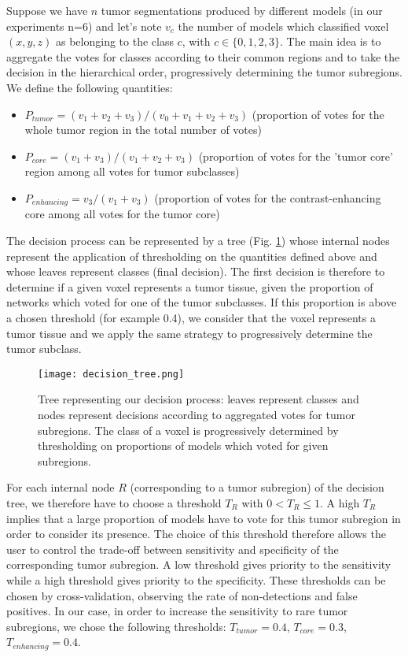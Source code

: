 \documentclass[preprint,12pt]{elsarticle}
\begin{document}
Suppose we have $n$ tumor segmentations produced by different models (in our experiments n=6) and let's note $v_c$ the number of models which classified voxel $(x,y,z)$ as belonging to the class $c$, with $c \in \{0, 1, 2, 3\}$. The main idea is to aggregate the votes for classes according to their common regions and to take the decision in the hierarchical order, progressively determining the tumor subregions. We define the following quantities:
\begin{itemize}
\item $P_{tumor}=(v_1+v_2+v_3) / (v_0+ v_1+v_2+v_3)$ (proportion of votes for the whole tumor region in the total number of votes)
\item $P_{core}= (v_1+v_3)/(v_1+v_2+v_3)$ (proportion of votes for the 'tumor core' region among all votes for tumor subclasses)
\item $P_{enhancing}=v_3/ (v_1 + v_3)$ (proportion of votes for the contrast-enhancing core among all votes for the tumor core)
\end{itemize}
The decision process can be represented by a tree (Fig. \ref{fig_decision}) whose internal nodes represent the application of thresholding on the quantities defined above and whose leaves represent classes (final decision). The first decision is therefore to determine if a given voxel represents a tumor tissue, given the proportion of networks which voted for one of the tumor subclasses. If this proportion is above a chosen threshold (for example 0.4), we consider that the voxel represents a tumor tissue and we apply the same strategy to progressively determine the tumor subclass.

\begin{figure}[!ht]
\centering
\texttt{[image: decision\_tree.png]}
\caption{Tree representing our decision process: leaves represent classes and nodes represent decisions according to aggregated votes for tumor subregions. The class of a voxel is progressively determined by thresholding on proportions of models which voted for given subregions.}
\label{fig_decision}
\end{figure}


For each internal node $R$ (corresponding to a tumor subregion) of the decision tree, we therefore have to choose a threshold $T_R$ with $0<T_R \leq 1$. A high $T_R$ implies that a large proportion of models have to vote for this tumor subregion in order to consider its presence. The choice of this threshold therefore allows the user to control the trade-off between sensitivity and specificity of the corresponding tumor subregion. A low threshold gives priority to the sensitivity while a high threshold gives priority to the specificity. These thresholds can be chosen by cross-validation, observing the rate of non-detections and false positives. In our case, in order to increase the sensitivity to rare tumor subregions, we chose the following thresholds: $T_{tumor}=0.4$, $T_{core}=0.3$, $T_{enhancing}=0.4$.
\end{document}
